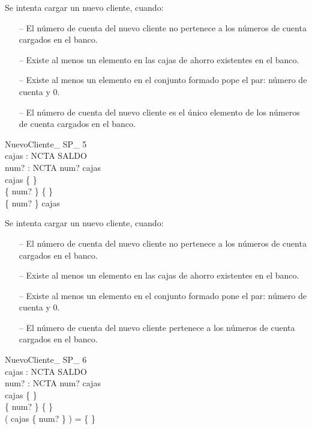 \begin{tcolorbox}[colback=gray!5!white,colframe=gray!50!black,
  colbacktitle=gray!75!black,title=NuevoCliente\_SP\_4]
  Se intenta cargar un nuevo cliente, cuando:
     \begin{itemize}
        \item[--]{El número de cuenta del nuevo cliente no pertenece a los números de cuenta cargados en el banco.}
        \item[--]{Existe al menos un elemento en las cajas de ahorro existentes en el banco.}
        \item[--]{Existe al menos un elemento en el conjunto formado pope el par: número de cuenta y 0.}
        \item[--]{El número de cuenta del nuevo cliente es el único elemento de los números de cuenta cargados en el banco.}
     \end{itemize}
\end{tcolorbox}


\begin{schema}{NuevoCliente\_ SP\_ 5}\\
 cajas : NCTA \pfun SALDO \\
 num? : NCTA 
\where
 num? \notin \dom cajas \\
 cajas \neq \{ \} \\
 \{ num?  \} \neq \{ \} \\
 \dom \{ num?  \} \subset \dom cajas
\end{schema}

\begin{tcolorbox}[colback=gray!5!white,colframe=gray!50!black,
  colbacktitle=gray!75!black,title=NuevoCliente\_SP\_5]
  Se intenta cargar un nuevo cliente, cuando:
     \begin{itemize}
        \item[--]{El número de cuenta del nuevo cliente no pertenece a los números de cuenta cargados en el banco.}
        \item[--]{Existe al menos un elemento en las cajas de ahorro existentes en el banco.}
        \item[--]{Existe al menos un elemento en el conjunto formado pone el par: número de cuenta y 0.}
        \item[--]{El número de cuenta del nuevo cliente pertenece a los números de cuenta cargados en el banco.}
     \end{itemize}
\end{tcolorbox}


\begin{schema}{NuevoCliente\_ SP\_ 6}\\
 cajas : NCTA \pfun SALDO \\
 num? : NCTA 
\where
 num? \notin \dom cajas \\
 cajas \neq \{ \} \\
 \{ num?  \} \neq \{ \} \\
 ( \dom cajas \cap \dom \{ num?  \} ) = \{ \}
\end{schema}

